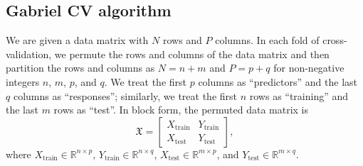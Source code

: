 \documentclass[11pt]{article}
\newcommand{\R}{\mathbb{R}}
\newcommand{\dataX}{\mathfrak{X}}
\newcommand{\Xtrain}{X_{\text{train}}}
\newcommand{\Ytrain}{Y_{\text{train}}}
\newcommand{\Xtest}{X_{\text{test}}}
\newcommand{\Ytest}{Y_{\text{test}}}
\begin{document}
\subsection{Gabriel CV algorithm}
\label{sec:gabriel-cv-algorithm}

We are given a data matrix with $N$ rows and $P$ columns.  In each fold of
cross-validation, we permute the rows and columns of the data matrix and then
partition the rows and columns as $N = n + m$ and $P = p + q$ for 
non-negative integers $n$, $m$, $p$, and $q$.  We treat the first $p$
columns as ``predictors'' and the last $q$ columns as ``responses'';
similarly, we treat the first $n$ rows as ``training'' and the last $m$ rows
as ``test''.  In block form, the permuted data matrix is
\[
  \dataX
  =
  \begin{bmatrix}
    \Xtrain & \Ytrain \\
    \Xtest  & \Ytest
  \end{bmatrix},
\]
where
$\Xtrain \in \R^{n \times p}$,
$\Ytrain \in \R^{n \times q}$,
$\Xtest \in  \R^{m \times p}$,
and
$\Ytest \in  \R^{m \times q}$.
\end{document}
